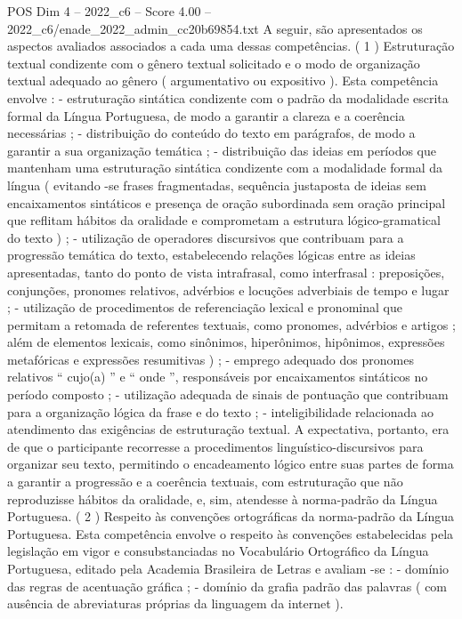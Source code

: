 \begin{textsample}{POS Dim 4 – 2022\_c6 – Score 4.00 – 2022\_c6/enade\_2022\_admin\_cc20b69854.txt}
A seguir, são apresentados os aspectos avaliados associados a cada uma dessas competências. ( 1 ) Estruturação textual condizente com o gênero textual solicitado e o modo de organização textual adequado ao gênero ( argumentativo ou expositivo ).
Esta competência envolve : - estruturação sintática condizente com o padrão da modalidade escrita formal da Língua Portuguesa, de modo a garantir a clareza e a coerência necessárias ; - distribuição do conteúdo do texto em parágrafos, de modo a garantir a sua organização temática ; - distribuição das ideias em períodos que mantenham uma estruturação sintática condizente com a modalidade formal da língua ( evitando -se frases fragmentadas, sequência justaposta de ideias sem encaixamentos sintáticos e presença de oração subordinada sem oração principal que reflitam hábitos da oralidade e comprometam a estrutura lógico-gramatical do texto ) ; - utilização de operadores discursivos que contribuam para a progressão temática do texto, estabelecendo relações lógicas entre as ideias apresentadas, tanto do ponto de vista intrafrasal, como interfrasal : preposições, conjunções, pronomes relativos, advérbios e locuções adverbiais de tempo e lugar ; - utilização de procedimentos de referenciação lexical e pronominal que permitam a retomada de referentes textuais, como pronomes, advérbios e artigos ; além de elementos lexicais, como sinônimos, hiperônimos, hipônimos, expressões metafóricas e expressões resumitivas ) ; - emprego adequado dos pronomes relativos “ cujo(a) ” e “ onde ”, responsáveis por encaixamentos sintáticos no período composto ; - utilização adequada de sinais de pontuação que contribuam para a organização lógica da frase e do texto ; - inteligibilidade relacionada ao atendimento das exigências de estruturação textual.
A expectativa, portanto, era de que o participante recorresse a procedimentos linguístico-discursivos para organizar seu texto, permitindo o encadeamento lógico entre suas partes de forma a garantir a progressão e a coerência textuais, com estruturação que não reproduzisse hábitos da oralidade, e, sim, atendesse à norma-padrão da Língua Portuguesa. ( 2 ) Respeito às convenções ortográficas da norma-padrão da Língua Portuguesa.
Esta competência envolve o respeito às convenções estabelecidas pela legislação em vigor e consubstanciadas no Vocabulário Ortográfico da Língua Portuguesa, editado pela Academia Brasileira de Letras e avaliam -se : - domínio das regras de acentuação gráfica ; - domínio da grafia padrão das palavras ( com ausência de abreviaturas próprias da linguagem da internet ).

\end{textsample}
